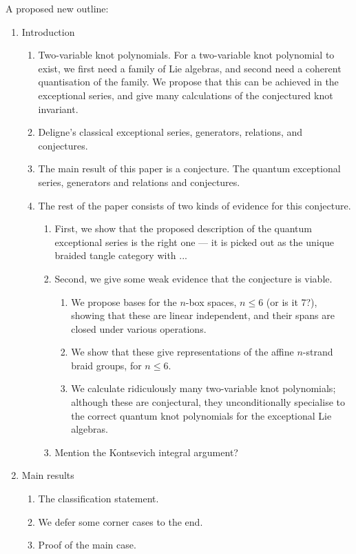 \documentclass[12pt]{amsart}
\begin{document}
A proposed new outline:
\begin{enumerate}
\item Introduction
\begin{enumerate}
\item Two-variable knot polynomials. For a two-variable knot polynomial to
exist, we first need a family of Lie algebras, and second need a coherent
quantisation of the family. We propose that this can be achieved in the 
exceptional series, and give many calculations of the conjectured knot
invariant.
\item Deligne's classical exceptional series, generators, relations, and 
conjectures.
\item The main result of this paper is a conjecture.
The quantum exceptional series, generators and relations and conjectures.
\item The rest of the paper consists of two kinds of evidence for this 
conjecture.
\begin{enumerate}
\item First, we show that the proposed description of the quantum exceptional 
series is the right one --- it is picked out as the unique braided tangle
category
with ...
\item Second, we give some weak evidence that the conjecture is viable.
\begin{enumerate}
\item We propose bases for the $n$-box spaces, $n \leq 6$ (or is it 7?), 
showing that these are linear independent, and their spans are closed under
various operations.
\item We show that these give representations of the affine $n$-strand braid 
groups, for $n \leq 6$.
\item We calculate ridiculously many two-variable knot polynomials; although 
these are conjectural, they unconditionally specialise to the correct quantum
knot polynomials for the exceptional Lie algebras.
\end{enumerate}
\item Mention the Kontsevich integral argument?
\end{enumerate}
\end{enumerate}
\item Main results
\begin{enumerate}
\item The classification statement.
\item We defer some corner cases to the end.
\item Proof of the main case.

\end{enumerate}
\end{enumerate}
\end{document}
